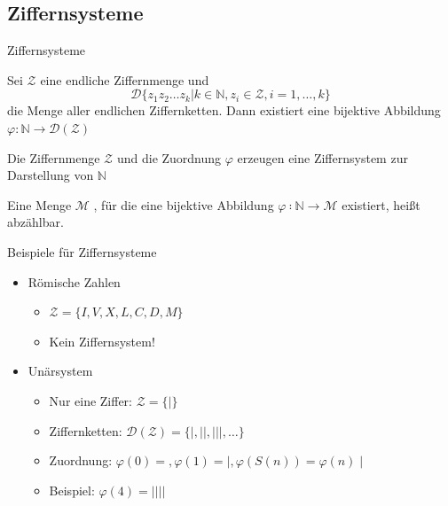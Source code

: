 \documentclass[12pt%
,aspectratio=169%
]{beamer}
\begin{document}
\subsection{Ziffernsysteme}
\begin{frame}{Ziffernsysteme}
\begin{theorem}
Sei $\mathcal{Z}$ eine endliche Ziffernmenge und
$$
	\mathcal{D} \{z_1z_2 \ldots z_k | k \in \mathbb{N}, z_i \in \mathcal{Z}, i = 1, \ldots, k\}
$$
die Menge aller endlichen Ziffernketten. Dann existiert eine bijektive Abbildung $\varphi : \mathbb{N} \to \mathcal{D}(\mathcal{Z})$
\end{theorem}
\begin{definition}
Die Ziffernmenge $\mathcal{Z}$ und die Zuordnung $\varphi$ erzeugen eine Ziffernsystem zur Darstellung von $\mathbb{N}$
\end{definition}
\begin{definition}
Eine Menge $\mathcal{M}$ , für die eine bijektive Abbildung $\varphi ∶ \mathbb{N} \to \mathcal{M}$ existiert, heißt abzählbar.
\end{definition}
\end{frame}

\begin{frame}{Beispiele für Ziffernsysteme}
\begin{itemize}
	\item Römische Zahlen
	\begin{itemize}
		\item $\mathcal{Z} = \{I, V, X, L, C, D, M\}$
		\item Kein Ziffernsystem!
	\end{itemize}
	\item Unärsystem
	\begin{itemize}
		\item Nur eine Ziffer: $\mathcal{Z} = \{|\}$
		\item Ziffernketten: $\mathcal{D}(\mathcal{Z}) = \{|, ||, |||, \ldots \}$
		\item Zuordnung: $\varphi(0) =, \varphi(1) = |, \varphi(S(n)) = \varphi(n)∣$
		\item Beispiel: $\varphi(4) = ||||$
	\end{itemize}
\end{itemize}
\end{frame}
\end{document}
